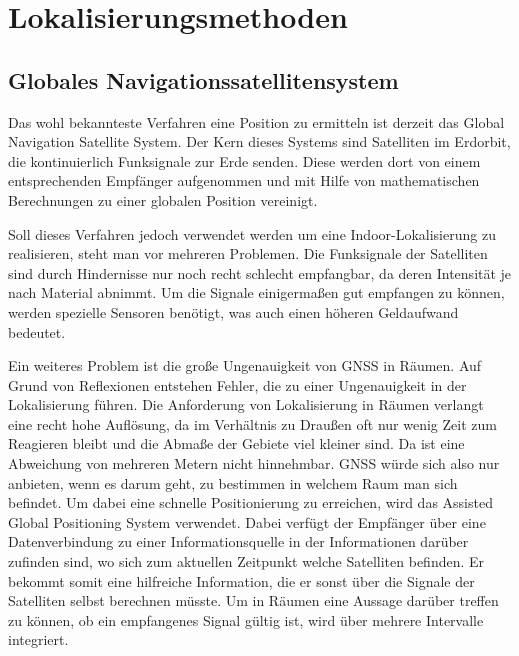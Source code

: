 \chapter{Lokalisierungsmethoden}

\section{Globales Navigationssatellitensystem}
Das wohl bekannteste Verfahren eine Position zu ermitteln ist derzeit das
\dq Global Navigation Satellite System\dq. Der Kern dieses Systems sind Satelliten im Erdorbit, die
kontinuierlich Funksignale zur Erde senden. Diese werden dort von einem
entsprechenden Empfänger aufgenommen und mit Hilfe von mathematischen
Berechnungen zu einer globalen Position vereinigt.

Soll dieses Verfahren jedoch verwendet werden um eine Indoor-Lokalisierung
zu realisieren, steht man vor mehreren Problemen. Die
Funksignale der Satelliten sind durch Hindernisse nur noch recht schlecht
empfangbar, da deren Intensität je nach Material abnimmt. Um die Signale
einigermaßen gut empfangen zu können, werden spezielle Sensoren benötigt, was
auch einen höheren Geldaufwand bedeutet.

Ein weiteres Problem ist die große Ungenauigkeit von GNSS in Räumen. Auf Grund
von Reflexionen entstehen Fehler, die zu einer Ungenauigkeit in der
Lokalisierung führen. Die Anforderung von Lokalisierung in Räumen verlangt
eine recht hohe Auflösung, da im Verhältnis zu Draußen oft nur wenig Zeit
zum Reagieren bleibt und die Abmaße der Gebiete viel kleiner sind. Da ist
eine Abweichung von mehreren Metern nicht hinnehmbar. GNSS würde sich also
nur anbieten, wenn es darum geht, zu bestimmen in welchem Raum man sich
befindet. Um dabei eine schnelle Positionierung zu erreichen, wird das
\dq Assisted Global Positioning System\dq{} verwendet. Dabei verfügt der Empfänger über eine Datenverbindung
zu einer Informationsquelle in der Informationen darüber zufinden sind,
wo sich zum aktuellen Zeitpunkt welche Satelliten befinden. Er bekommt somit
eine hilfreiche Information, die er sonst über die Signale der Satelliten
selbst berechnen müsste. Um in Räumen eine Aussage darüber treffen zu können,
ob ein empfangenes Signal gültig ist, wird über mehrere Intervalle integriert.

